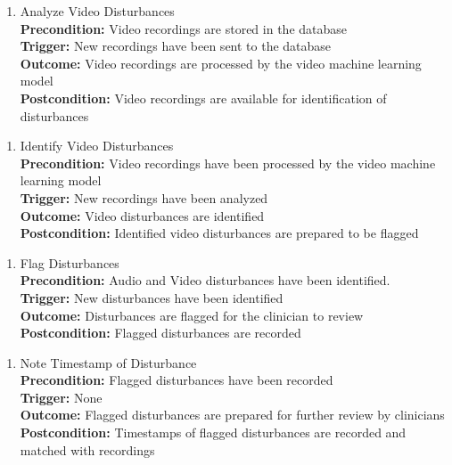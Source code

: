 \documentclass[12pt]{article}
\begin{document}
\begin{enumerate}[label={PUC-}25. ]
  \item Analyze Video Disturbances\\
  \textbf{Precondition: }Video recordings are stored in the database\\
  \textbf{Trigger: }New recordings have been sent to the database\\
  \textbf{Outcome: }Video recordings are processed by the video machine learning model\\
  \textbf{Postcondition: }Video recordings are available for identification of disturbances\\
\end{enumerate}

\begin{enumerate}[label={PUC-}26. ]
  \item Identify Video Disturbances\\
  \textbf{Precondition: }Video recordings have been processed by the video machine learning model\\
  \textbf{Trigger: }New recordings have been analyzed\\
  \textbf{Outcome: }Video disturbances are identified\\
  \textbf{Postcondition: }Identified video disturbances are prepared to be flagged\\
\end{enumerate}

\begin{enumerate}[label={PUC-}27. ]
  \item Flag Disturbances\\
  \textbf{Precondition: }Audio and Video disturbances have been identified.\\
  \textbf{Trigger: }New disturbances have been identified\\
  \textbf{Outcome: }Disturbances are flagged for the clinician to review\\
  \textbf{Postcondition: }Flagged disturbances are recorded\\
\end{enumerate}

\begin{enumerate}[label={PUC-}28. ]
  \item Note Timestamp of Disturbance\\
  \textbf{Precondition: }Flagged disturbances have been recorded\\
  \textbf{Trigger: }None\\
  \textbf{Outcome: }Flagged disturbances are prepared for further review by clinicians\\
  \textbf{Postcondition: }Timestamps of flagged disturbances are recorded and matched with recordings\\
\end{enumerate}
\end{document}
